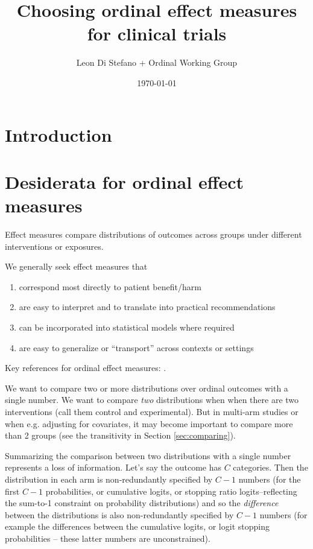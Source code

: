 \documentclass[
  11pt,
  fleqn
]{article}
\title{Choosing ordinal effect measures for clinical trials}
\author{Leon Di Stefano + Ordinal
Working Group}
\date{\today}
\begin{document}
\maketitle

\tableofcontents
\newpage

\section{Introduction}

\section{Desiderata for ordinal effect measures}

Effect measures compare distributions of outcomes across groups
under different interventions or exposures.

We generally seek effect measures that
\begin{enumerate}
  \item correspond most directly to patient benefit/harm
  \item are easy to interpret and to translate into practical recommendations
  \item can be incorporated into statistical models where required
  \item are easy to generalize or ``transport'' across contexts or settings
\end{enumerate}

Key references for ordinal effect measures:
\citet{agrestiMeasuresNominalOrdinalAssociation1981,agrestiOrdinalProbabilityEffect2017,
agrestiSimpleWaysInterpret2018}.

We want to compare two or more distributions over ordinal
outcomes with a single number. We want to compare \emph{two} distributions
when when there are two interventions (call them control and
experimental). But in multi-arm studies or when e.g. adjusting for
covariates, it may become important to compare more than 2 groups
(see the transitivity in Section \ref{sec:comparing}).

Summarizing the comparison between two distributions with a single
number represents a loss of information. Let's say the
outcome has $C$ categories. Then the distribution in each
arm is non-redundantly specified by $C-1$ numbers (for the first
  $C-1$ probabilities,
  or cumulative logits, or stopping ratio logits--reflecting the
sum-to-1 constraint on probability distributions) and so the
\emph{difference} between the distributions is also non-redundantly specified by
$C-1$ numbers (for example the differences between the cumulative
  logits, or logit stopping probabilities -- these latter numbers are
unconstrained).
\end{document}
